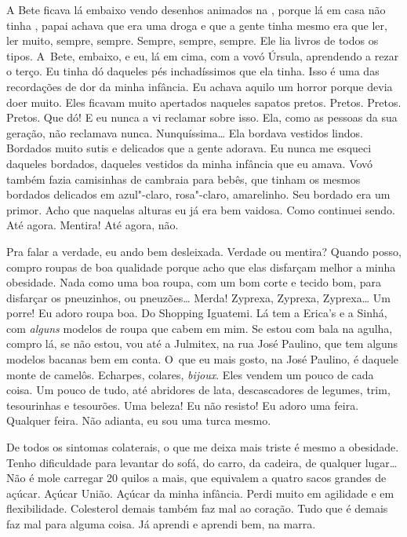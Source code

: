 A Bete ficava lá embaixo vendo desenhos animados na , porque lá em
casa não tinha , papai achava que  era uma droga e que a gente tinha
mesmo era que ler, ler muito, sempre, sempre. Sempre, sempre, sempre.
Ele lia livros de todos os tipos. A~Bete, embaixo, e eu, lá em cima, com
a vovó Úrsula, aprendendo a rezar o terço. Eu tinha dó daqueles pés
inchadíssimos que ela tinha. Isso é uma das recordações de dor da minha
infância. Eu achava aquilo um horror porque devia doer muito. Eles
ficavam muito apertados naqueles sapatos pretos. Pretos. Pretos. Pretos.
Que dó! E eu nunca a vi reclamar sobre isso. Ela, como as pessoas da sua
geração, não reclamava nunca. Nunquíssima… Ela bordava vestidos
lindos. Bordados muito sutis e delicados que a gente adorava. Eu nunca
me esqueci daqueles bordados, daqueles vestidos da minha infância que eu
amava. Vovó também fazia camisinhas de cambraia para bebês, que tinham
os mesmos bordados delicados em azul"-claro, rosa"-claro, amarelinho. Seu
bordado era um primor. Acho que naquelas alturas eu já era bem vaidosa.
Como continuei sendo. Até agora. Mentira! Até agora, não.

Pra falar a verdade, eu ando bem desleixada. Verdade ou mentira? Quando
posso, compro roupas de boa qualidade porque acho que elas disfarçam
melhor a minha obesidade. Nada como uma boa roupa, com um bom corte e
tecido bom, para disfarçar os pneuzinhos, ou pneuzões… Merda!
Zyprexa, Zyprexa, Zyprexa… Um porre! Eu adoro roupa boa. Do
Shopping Iguatemi. Lá tem a Erica's e a Sinhá, com \emph{alguns} modelos
de roupa que cabem em mim. Se estou com bala na agulha, compro lá, se
não estou, vou até a Julmitex, na rua José Paulino, que tem alguns
modelos bacanas bem em conta. O~que eu mais gosto, na José Paulino, é
daquele monte de camelôs. Echarpes, colares, \emph{bijoux}. Eles vendem
um pouco de cada coisa. Um pouco de tudo, até abridores de lata,
descascadores de legumes, trim, tesourinhas e tesourões. Uma beleza! Eu
não resisto! Eu adoro uma feira. Qualquer feira. Não adianta, eu sou uma
turca mesmo.

De todos os sintomas colaterais, o que me deixa mais triste é mesmo a
obesidade. Tenho dificuldade para levantar do sofá, do carro, da
cadeira, de qualquer lugar… Não é mole carregar 20 quilos a mais,
que equivalem a quatro sacos grandes de açúcar. Açúcar União. Açúcar da
minha infância. Perdi muito em agilidade e em flexibilidade. Colesterol
demais também faz mal ao coração. Tudo que é demais faz mal para alguma
coisa. Já aprendi e aprendi bem, na marra.

